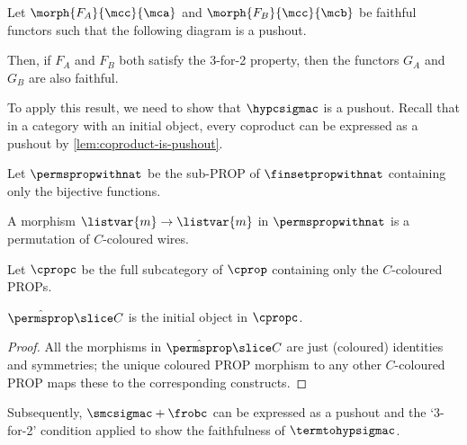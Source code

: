 \begin{theorem}
    \label{thm:faithful-pushout}
    Let \(\morph{F_A}{\mcc}{\mca}\) and \(\morph{F_B}{\mcc}{\mcb}\) be faithful
    functors such that the following diagram is a pushout.
    \begin{center}
        
    \end{center}
    Then, if \(F_A\) and \(F_B\) both satisfy the 3-for-2 property, then the
    functors \(G_A\) and \(G_B\) are also faithful.
\end{theorem}

To apply this result, we need to show that \(\hypcsigmac\) is a pushout.
Recall that in a category with an initial object, every coproduct can be
expressed as a pushout by \cref{lem:coproduct-is-pushout}.

\begin{definition}
    Let \(\permspropwithnat\) be the sub-PROP of \(\finsetpropwithnat\)
    containing only the bijective functions.
\end{definition}

A morphism \(\listvar{m} \to \listvar{m}\) in \(\permspropwithnat\) is a
permutation of \(C\)-coloured wires.

\begin{definition}
    Let \(\cpropc\) be the full subcategory of \(\cprop\) containing only the
    \(C\)-coloured PROPs.
\end{definition}

\begin{lemma}\label{lem:cpropc-initial}
    \(\hat{\permsprop} \slice C\) is the initial object in \(\cpropc\).
\end{lemma}
\begin{proof}
    All the morphisms in \(\hat{\permsprop} \slice C\) are just (coloured)
    identities and symmetries; the unique coloured PROP morphism to any other
    \(C\)-coloured PROP maps these to the corresponding constructs.
\end{proof}

Subsequently, \(\smcsigmac + \frobc\) can be expressed as a pushout and the
`3-for-2' condition applied to show the faithfulness of \(\termtohypsigmac\).

